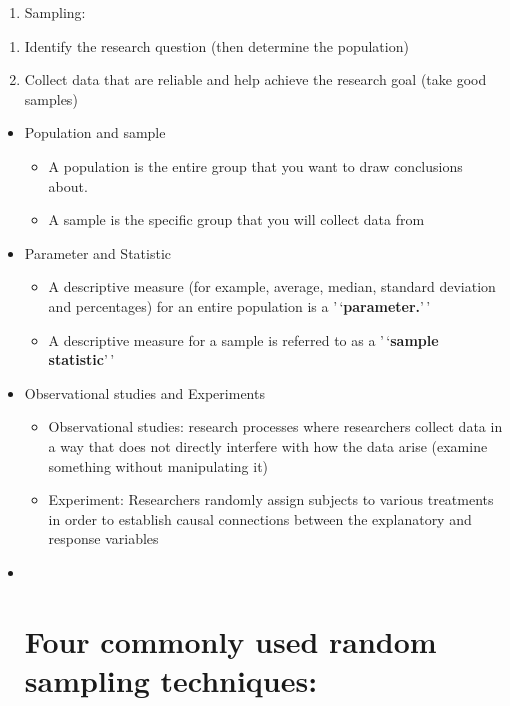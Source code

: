 \documentclass[
]{book}
\providecommand{\tightlist}{%
  \setlength{\itemsep}{0pt}\setlength{\parskip}{0pt}}
\begin{document}
\begin{enumerate}
\def\labelenumi{\arabic{enumi}.}
\setcounter{enumi}{2}
\tightlist
\item
  Sampling:
\end{enumerate}

\begin{enumerate}
\def\labelenumi{\arabic{enumi})}
\item
  Identify the research question (then determine the population)
\item
  Collect data that are reliable and help achieve the research goal (take good samples)
\end{enumerate}

\begin{itemize}
\item
  Population and sample

  \begin{itemize}
  \tightlist
  \item
    A population is the entire group that you want to draw conclusions about.
  \item
    A sample is the specific group that you will collect data from
  \end{itemize}
\item
  Parameter and Statistic

  \begin{itemize}
  \tightlist
  \item
    A descriptive measure (for example, average, median, standard deviation and percentages) for an entire population is a '\,`\textbf{parameter.}'\,'
  \item
    A descriptive measure for a sample is referred to as a '\,`\textbf{sample statistic}'\,'
  \end{itemize}
\item
  Observational studies and Experiments

  \begin{itemize}
  \tightlist
  \item
    Observational studies: research processes where researchers collect data in a way that does not directly interfere with how the data arise (examine something without manipulating it)
  \item
    Experiment: Researchers randomly assign subjects to various treatments in order to establish causal connections between the explanatory and response variables
  \end{itemize}
\item ~
  \section{Four commonly used random sampling techniques:}\label{four-commonly-used-random-sampling-techniques}


\end{itemize}
\end{document}
